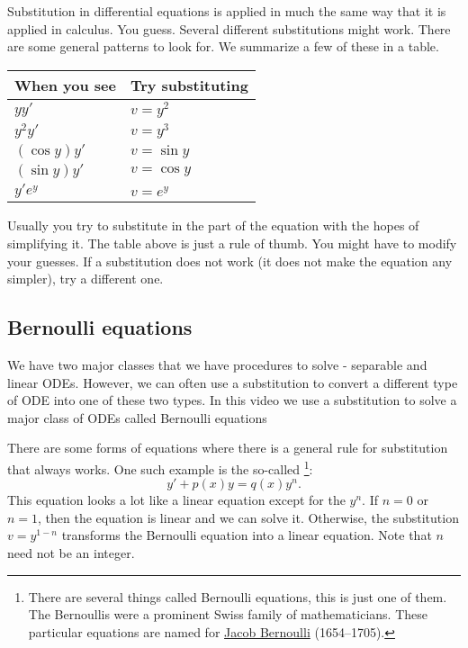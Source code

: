 Substitution in differential equations is applied in much the same way that
it is applied in calculus.  You guess.  Several different substitutions might
work.  There are some general patterns to look for.  We summarize a few
of these in a table.

\begin{center}
\begin{tabular}{@{}ll@{}}
\toprule
When you see & Try substituting \\
\midrule
$yy'$ & $v=y^2$ \\
$y^2y'$ & $v=y^3$ \\
$(\cos y)y'$ & $v=\sin y$ \\
$(\sin y)y'$ & $v=\cos y$ \\
$y'e^y$ & $v=e^y$ \\ \bottomrule
\end{tabular}
\end{center}

Usually you try to substitute in the  part of the
equation with the hopes of simplifying it.  The table above is just a rule
of thumb.  You might have to modify your guesses.  If a substitution
does not work (it does not make the equation any simpler), try a different one.

\subsection{Bernoulli equations}

\begin{video}
    We have two major classes that we have procedures to solve - separable and linear ODEs. However, we can often use a substitution to convert a different type of ODE into one of these two types. In this video we use a substitution to solve a major class of ODEs called Bernoulli equations
\end{video}

There are some forms of equations where there is a
general rule for substitution that always works.
One such example is the so-called
\emph{}%
\footnote{There are several things called Bernoulli equations, this is just one
of them.  The Bernoullis were a prominent Swiss family of mathematicians.  These
particular equations are named for
\href{https://en.wikipedia.org/wiki/Jacob_Bernoulli}{Jacob Bernoulli} (1654--1705).}:
\begin{equation*}
y' + p(x)y = q(x)y^n .
\end{equation*}
This equation
looks a lot like a linear equation except for the $y^n$.  If $n=0$ or
$n=1$, then the equation is linear and we can solve it.  Otherwise,
the substitution $v=y^{1-n}$ transforms the 
Bernoulli equation into a linear equation.  Note that $n$
need not be an integer.

